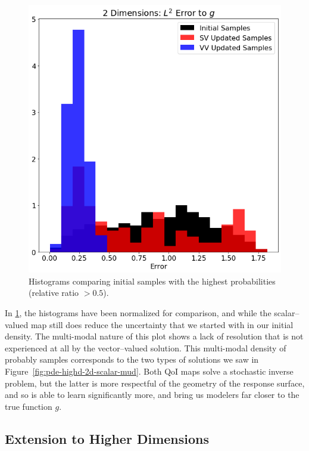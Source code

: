 \begin{figure}[htbp]
\centering
  \includegraphics[width=0.675\linewidth]{figures/pde-highd/pde-highd_hist_D2_t5-0E-01}
\caption{
Histograms comparing initial samples with the highest probabilities (relative ratio $> 0.5$).
}
\label{fig:pde-highd-2d-hist}
\end{figure}

In \ref{fig:pde-highd-2d-hist}, the histograms have been normalized for comparison, and while the scalar--valued map still does reduce the uncertainty that we started with in our initial density.
The multi-modal nature of this plot shows a lack of resolution that is not experienced at all by the vector--valued solution.
This multi-modal density of probably samples corresponds to the two types of solutions we saw in Figure~\ref{fig:pde-highd-2d-scalar-mud}.
Both QoI maps solve a stochastic inverse problem, but the latter is more respectful of the geometry of the response surface, and so is able to learn significantly more, and bring us modelers far closer to the true function $g$.


\FloatBarrier
\subsection{Extension to Higher Dimensions}


